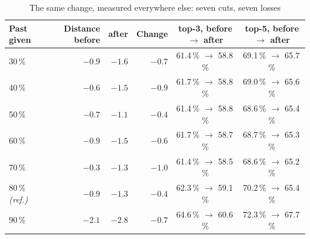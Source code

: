 \begin{table}[H]
\centering\footnotesize
\caption{The same change, measured everywhere else: seven cuts, seven losses}
\label{tab:after-sampling}
\begin{tabular}{@{}lrrrcc@{}}
\toprule
\textbf{Past given} & \textbf{Distance before} & \textbf{after} & \textbf{Change}
& \textbf{top-3, before $\rightarrow$ after} & \textbf{top-5, before $\rightarrow$ after} \\
\midrule
30\,\% & $-0.9$ & $-1.6$ & $-0.7$ & 61.4\,\% $\rightarrow$ 58.8\,\% & 69.1\,\% $\rightarrow$ 65.7\,\% \\
40\,\% & $-0.6$ & $-1.5$ & $-0.9$ & 61.7\,\% $\rightarrow$ 58.8\,\% & 69.0\,\% $\rightarrow$ 65.6\,\% \\
50\,\% & $-0.7$ & $-1.1$ & $-0.4$ & 61.4\,\% $\rightarrow$ 58.8\,\% & 68.6\,\% $\rightarrow$ 65.4\,\% \\
60\,\% & $-0.9$ & $-1.5$ & $-0.6$ & 61.7\,\% $\rightarrow$ 58.7\,\% & 68.7\,\% $\rightarrow$ 65.3\,\% \\
70\,\% & $-0.3$ & $-1.3$ & $-1.0$ & 61.4\,\% $\rightarrow$ 58.5\,\% & 68.6\,\% $\rightarrow$ 65.2\,\% \\
80\,\% \textit{(ref.)} & $-0.9$ & $-1.3$ & $-0.4$ & 62.3\,\% $\rightarrow$ 59.1\,\% & 70.2\,\% $\rightarrow$ 65.4\,\% \\
90\,\% & $-2.1$ & $-2.8$ & $-0.7$ & 64.6\,\% $\rightarrow$ 60.6\,\% & 72.3\,\% $\rightarrow$ 67.7\,\% \\
\bottomrule
\end{tabular}

\end{table}
